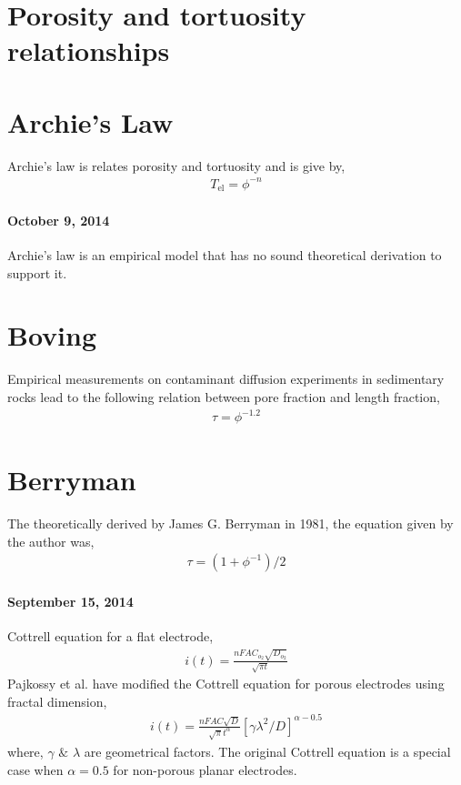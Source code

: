 \documentclass[12pt]{book}
\begin{document}
\section{Porosity and tortuosity relationships}
\section{Archie's Law} Archie's law is relates porosity and tortuosity and is give by,
\begin{align}
T_{\textrm{el}}=\phi^{-n}
\end{align}
\paragraph{October 9, 2014}
Archie's law is an empirical model that has no sound theoretical derivation to support it.\cite{Shen2007}
\section{Boving} Empirical measurements on contaminant diffusion experiments in sedimentary rocks lead to the following relation between pore fraction and length fraction\cite{boving2001},
\begin{align}
\tau = \phi^{-1.2}
\end{align}
\section{Berryman} The theoretically derived by James G. Berryman in 1981\cite{berryman1981}, the equation given by the author was,
\begin{align}
\tau = \left(1+\phi^{-1}\right)/2
\end{align}
\paragraph{September 15, 2014}
Cottrell equation for a flat electrode,
\begin{align}
i(t)=\frac{nFAC_{o_2}\sqrt{D_{o_2}}}{\sqrt{\pi t}}
\label{Cottrel_original}
\end{align} 
Pajkossy et al. have modified the Cottrell equation for porous electrodes using fractal dimension,
\begin{align}
i(t)=\frac{nFAC\sqrt{D}}{\sqrt{\pi}t^\alpha}\left[\gamma\lambda^2/D\right]^{\alpha-0.5}
\label{Cottrel_fractal}
\end{align} 
where, $\gamma$ $\&$ $\lambda$ are geometrical factors.
The original Cottrell equation is a special case when $\alpha=0.5$ for non-porous planar electrodes.
\end{document}
